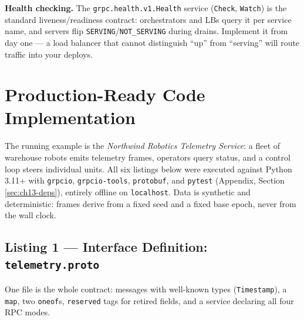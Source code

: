 \textbf{Health checking.} The \texttt{grpc.health.v1.Health} service
(\texttt{Check}, \texttt{Watch}) is the standard liveness/readiness contract:
orchestrators and LBs query it per service name, and servers flip
\texttt{SERVING}/\texttt{NOT\_SERVING} during drains. Implement it from day one
--- a load balancer that cannot distinguish ``up'' from ``serving'' will route
traffic into your deploys.

\section{Production-Ready Code Implementation}
\label{sec:ch13-code}
The running example is the \emph{Northwind Robotics Telemetry Service}: a fleet
of warehouse robots emits telemetry frames, operators query status, and a
control loop steers individual units. All six listings below were executed
against Python 3.11+ with \texttt{grpcio}, \texttt{grpcio-tools},
\texttt{protobuf}, and \texttt{pytest} (Appendix, Section~%
\ref{sec:ch13-deps}), entirely offline on \texttt{localhost}. Data is synthetic
and deterministic: frames derive from a fixed seed and a fixed base epoch,
never from the wall clock.

\subsection{Listing 1 --- Interface Definition: \texttt{telemetry.proto}}
\label{subsec:ch13-code-proto}

One file is the whole contract: messages with well-known types
(\texttt{Timestamp}), a \texttt{map}, two \texttt{oneof}s, \texttt{reserved}
tags for retired fields, and a service declaring all four RPC modes.

